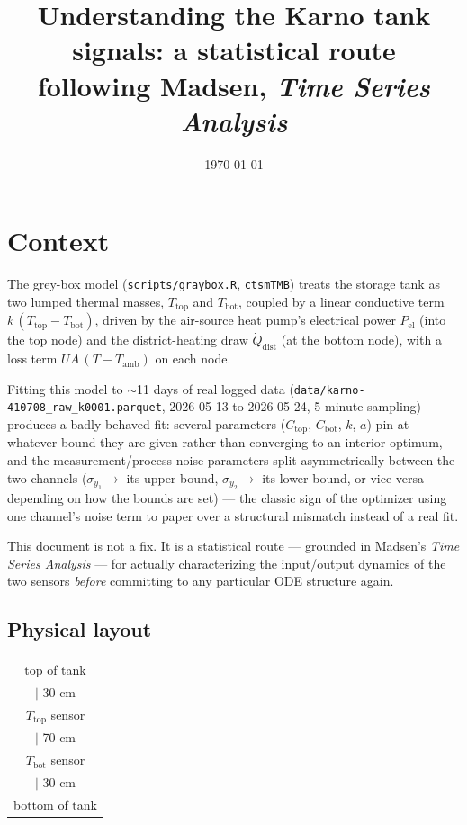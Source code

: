 \documentclass[11pt]{article}
\title{Understanding the Karno tank signals: a statistical route\\
\large following Madsen, \emph{Time Series Analysis}}
\author{}
\date{\today}
\begin{document}
\maketitle

\section{Context}

The grey-box model (\texttt{scripts/graybox.R}, \texttt{ctsmTMB}) treats the
storage tank as two lumped thermal masses, $T_{\text{top}}$ and
$T_{\text{bot}}$, coupled by a linear conductive term $k\,(T_{\text{top}} -
T_{\text{bot}})$, driven by the air-source heat pump's electrical power
$P_{\text{el}}$ (into the top node) and the district-heating draw
$\dot Q_{\text{dist}}$ (at the bottom node), with a loss term $UA\,(T -
T_{\text{amb}})$ on each node.

Fitting this model to $\sim$11 days of real logged data
(\texttt{data/karno-410708\_raw\_k0001.parquet}, 2026-05-13 to 2026-05-24,
5-minute sampling) produces a badly behaved fit: several parameters
($C_{\text{top}}$, $C_{\text{bot}}$, $k$, $a$) pin at whatever bound they are
given rather than converging to an interior optimum, and the measurement/process
noise parameters split asymmetrically between the two channels ($\sigma_{y_1}
\to$ its upper bound, $\sigma_{y_2} \to$ its lower bound, or vice versa
depending on how the bounds are set) --- the classic sign of the optimizer
using one channel's noise term to paper over a structural mismatch instead of
a real fit.

This document is not a fix. It is a statistical route --- grounded in Madsen's
\emph{Time Series Analysis} --- for actually characterizing the input/output
dynamics of the two sensors \emph{before} committing to any particular ODE
structure again.

\subsection{Physical layout}

\begin{center}
\begin{tabular}{c}
top of tank \\
$\vert$ 30 cm \\
$T_{\text{top}}$ sensor \\
$\vert$ 70 cm \\
$T_{\text{bot}}$ sensor \\
$\vert$ 30 cm \\
bottom of tank
\end{tabular}
\end{center}
\end{document}
